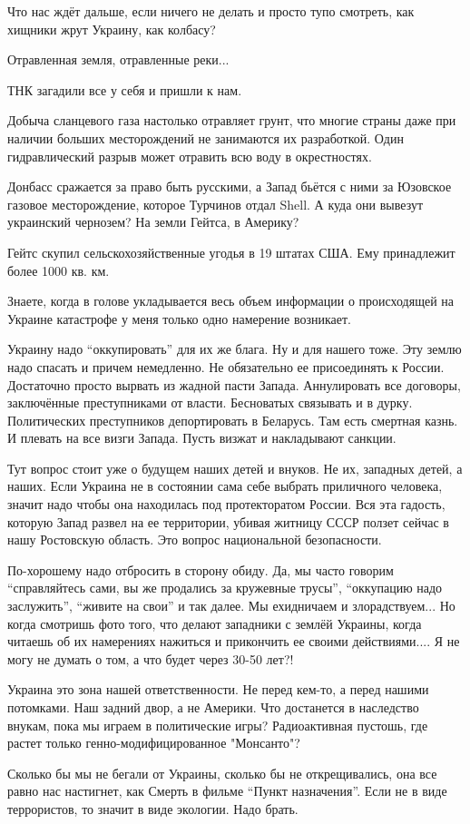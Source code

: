 Что нас ждёт дальше, если ничего не делать и просто тупо смотреть, как хищники
жрут Украину, как колбасу?

Отравленная земля, отравленные реки...

ТНК загадили все у себя и пришли к нам.

Добыча сланцевого газа настолько отравляет грунт, что многие страны даже при
наличии больших месторождений не занимаются их разработкой. Один гидравлический
разрыв может отравить всю воду в окрестностях.


Донбасс сражается за право быть русскими, а Запад бьётся с ними за Юзовское
газовое месторождение, которое Турчинов отдал Shell. А куда они вывезут
украинский чернозем? На земли Гейтса, в Америку?

\begin{zznagolos}
Гейтс скупил сельскохозяйственные угодья в 19 штатах США. Ему принадлежит более 1000 кв. км.	
\end{zznagolos}

Знаете, когда в голове укладывается весь объем информации о происходящей на
Украине катастрофе у меня только одно намерение возникает.

Украину надо \enquote{оккупировать} для их же блага. Ну и для нашего тоже. Эту землю
надо спасать и причем немедленно. Не обязательно ее присоединять к России.
Достаточно просто вырвать из жадной пасти Запада. Аннулировать все договоры,
заключённые преступниками от власти. Бесноватых связывать и в дурку.
Политических преступников депортировать в Беларусь. Там есть смертная казнь. И
плевать на все визги Запада. Пусть визжат и накладывают санкции.

Тут вопрос стоит уже о будущем наших детей и внуков. Не их, западных детей, а
наших. Если Украина не в состоянии сама себе выбрать приличного человека,
значит надо чтобы она находилась под протекторатом России. Вся эта гадость,
которую Запад развел на ее территории, убивая житницу СССР ползет сейчас в нашу
Ростовскую область. Это вопрос национальной безопасности.

По-хорошему надо отбросить в сторону обиду. Да, мы часто говорим \enquote{справляйтесь
сами, вы же продались за кружевные трусы}, \enquote{оккупацию надо заслужить},
\enquote{живите на свои} и так далее. Мы ехидничаем и злорадствуем... Но когда смотришь
фото того, что делают западники с землёй Украины, когда читаешь об их
намерениях нажиться и прикончить ее своими действиями.... Я не могу не думать о
том, а что будет через 30-50 лет?!

Украина это зона нашей ответственности. Не перед кем-то, а перед нашими
потомками. Наш задний двор, а не Америки. Что достанется в наследство внукам,
пока мы играем в политические игры? Радиоактивная пустошь, где растет только
генно-модифицированное "Монсанто"?

Сколько бы мы не бегали от Украины, сколько бы не открещивались, она все равно
нас настигнет, как Смерть в фильме \enquote{Пункт назначения}. Если не в виде
террористов, то значит в виде экологии. Надо брать.
